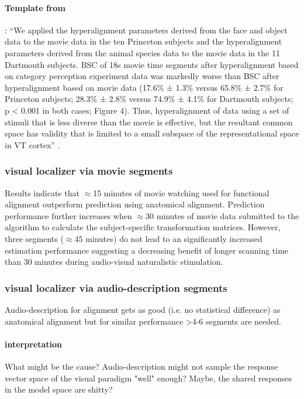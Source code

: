 \paragraph{Template from \citet{haxby2011common}}:
%
``We applied the hyperalignment parameters derived from the face and object data
to the movie data in the ten Princeton subjects and the hyperalignment
parameters derived from the animal species data to the movie data in the 11
Dartmouth subjects.
%
BSC of 18s movie time segments after hyperalignment based on category perception
experiment data was markedly worse than BSC after hyperalignment based on movie
data (17.6\% ± 1.3\% versus 65.8\% ± 2.7\% for Princeton subjects; 28.3\% ±
2.8\% versus 74.9\% ± 4.1\% for Dartmouth subjects; p < 0.001 in both cases;
Figure 4).
%
Thus, hyperalignment of data using a set of stimuli that is less diverse than
the movie is effective, but the resultant common space has validity that is
limited to a small subspace of the representational space in VT cortex''
\citep{haxby2011common}.


\subsubsection{visual localizer via movie segments}

%
Results indicate that $\approx$15 minutes of movie watching used for functional
alignment outperform prediction using anatomical alignment.
%
Prediction performance further increases when $\approx$30 minutes of movie data
submitted to the algorithm to calculate the subject-specific transformation
matrices.
%
However, three segments ($\approx$45 minutes) do not lead to an significantly
increased estimation performance suggesting a decreasing benefit of longer
scanning time than 30 minutes during audio-visual naturalistic stimulation.


\subsubsection{visual localizer via audio-description segments}

Audio-description for alignment gets as good (i.e. no statistical difference) as
anatomical alignment but for similar performance >4-6 segments are needed.


\paragraph{interpretation}
%
What might be the cause?
%
Audio-description might not sample the response vector space of the visual
paradigm "well" enough?
%
Maybe, the shared responses in the model space are shitty?

